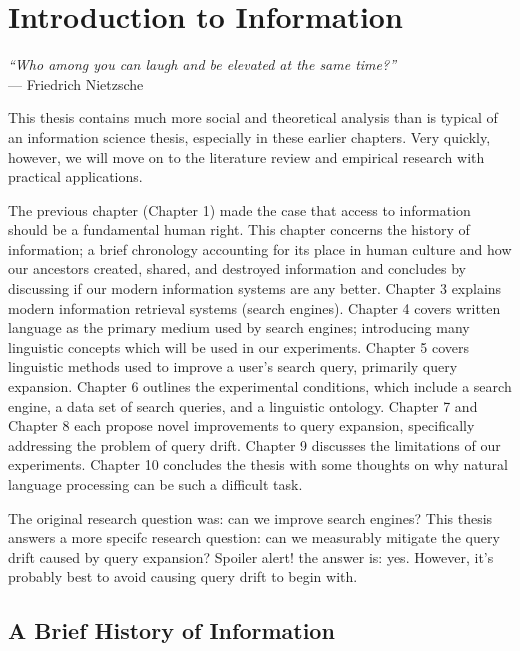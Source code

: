 \chapter{Introduction to Information}


\begin{flushright}
    \textit{``Who among you can laugh and be elevated at the same time?''}
    \\ --- Friedrich Nietzsche
\end{flushright}

This thesis contains much more social and theoretical analysis than is typical of an information science thesis, especially in these earlier chapters. Very quickly, however, we will move on to the literature review and empirical research with practical applications.

The previous chapter (Chapter 1) made the case that access to information should be a fundamental human right. This chapter concerns the history of information; a brief chronology accounting for its place in human culture and how our ancestors created, shared, and destroyed information and concludes by discussing if our modern information systems are any better. Chapter 3 explains modern information retrieval systems (search engines). Chapter 4 covers written language as the primary medium used by search engines; introducing many linguistic concepts which will be used in our experiments. Chapter 5 covers linguistic methods used to improve a user's search query, primarily query expansion. Chapter 6 outlines the experimental conditions, which include a search engine, a data set of search queries, and a linguistic ontology. Chapter 7 and Chapter 8 each propose novel improvements to query expansion, specifically addressing the problem of query drift. Chapter 9 discusses the limitations of our experiments. Chapter 10 concludes the thesis with some thoughts on why natural language processing can be such a difficult task.

The original research question was: can we improve search engines? This thesis answers a more specifc research question: can we measurably mitigate the query drift caused by query expansion? Spoiler alert! the answer is: yes. However, it's probably best to avoid causing query drift to begin with.

\section{A Brief History of Information}

